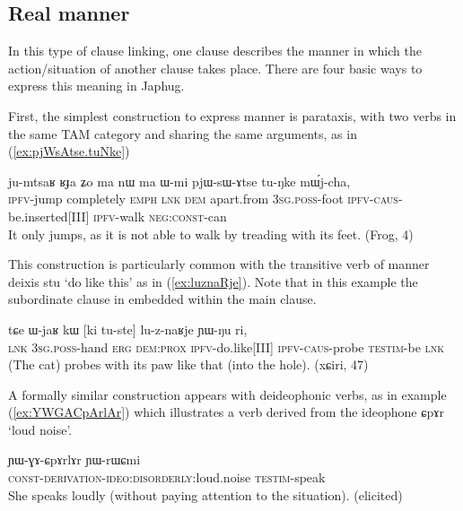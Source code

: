 \documentclass[oldfontcommands,oneside,a4paper,11pt]{article}
\newcommand{\ipa}[1]{{\phon \mbox{#1}}} %
\newcommand{\refb}[1]{(\ref{#1})}
\begin{document}
\subsection{Real manner}
In this type of clause linking, one clause describes the manner in which the action/situation of another clause takes place. There are four basic ways to express this meaning in Japhug.

First, the simplest construction to express manner is  parataxis, with    two verbs  in the same TAM category and sharing the same arguments, as in \refb{ex:pjWsAtse.tuNke}

\begin{exe}
\ex \label{ex:pjWsAtse.tuNke}
\gll
\ipa{ju-mtsaʁ} 	\ipa{ʁɟa} 	\ipa{ʑo} 	\ipa{ma} 	\ipa{nɯ} 	\ipa{ma} 	\ipa{ɯ-mi} 	\ipa{pjɯ-sɯ-ɤtse} 	\ipa{tu-ŋke} 	\ipa{mɯ́j-cha,} \\
\textsc{ipfv}-jump completely \textsc{emph} \textsc{lnk} \textsc{dem} apart.from \textsc{3sg.poss}-foot \textsc{ipfv-caus}-be.inserted[III] \textsc{ipfv}-walk \textsc{neg:const}-can \\
\glt It only jumps, as it is not able to walk by treading with its feet.  (Frog, 4)
\end{exe}

This construction is particularly common with the transitive verb of manner deixis \ipa{stu} `do like this' as in \refb{ex:luznaRje}. Note that in this example the subordinate clause in embedded within the main clause.

\begin{exe}
\ex \label{ex:luznaRje}
\gll
\ipa{tɕe} 	\ipa{ɯ-jaʁ} 	\ipa{kɯ} 	[\ipa{ki} 	\ipa{tu-ste}] 	\ipa{lu-z-naʁje} 	\ipa{ɲɯ-ŋu} 	\ipa{ri,} \\
\textsc{lnk} \textsc{3sg.poss}-hand \textsc{erg} \textsc{dem:prox} \textsc{ipfv}-do.like[III] \textsc{ipfv-caus}-probe \textsc{testim}-be \textsc{lnk} \\
\glt (The cat) probes with its paw like that (into the hole). (xɕiri, 47)
\end{exe}
A formally similar construction appears with deideophonic verbs, as in example \refb{ex:YWGACpArlAr} which illustrates a   verb derived from the ideophone \ipa{ɕpɤr} `loud noise'.  

\begin{exe}
\ex \label{ex:YWGACpArlAr}
\gll
\ipa{ɲɯ-ɣɤ-ɕpɤrlɤr} 	\ipa{ɲɯ-rɯɕmi} \\
\textsc{const-derivation-ideo:disorderly:}loud.noise \textsc{testim}-speak\\
\glt She speaks loudly (without paying attention to the situation). (elicited)
\end{exe}
\end{document}
